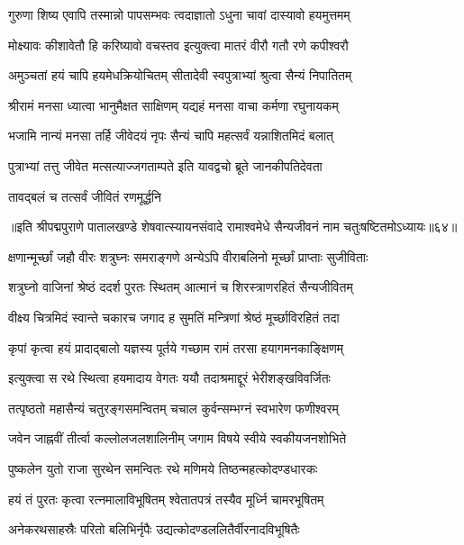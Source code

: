 \twolineshloka
{गुरुणा शिष्य एवापि तस्मान्नो पापसम्भवः}
{त्वदाज्ञातो ऽधुना चावां दास्यावो हयमुत्तमम्}%

\twolineshloka
{मोक्ष्यावः कीशावेतौ हि करिष्यावो वचस्तव}
{इत्युक्त्वा मातरं वीरौ गतौ रणे कपीश्वरौ}%

\twolineshloka
{अमुञ्चतां हयं चापि हयमेधक्रियोचितम्}
{सीतादेवी स्वपुत्राभ्यां श्रुत्वा सैन्यं निपातितम्}%

\twolineshloka
{श्रीरामं मनसा ध्यात्वा भानुमैक्षत साक्षिणम्}
{यद्यहं मनसा वाचा कर्मणा रघुनायकम्}%

\twolineshloka
{भजामि नान्यं मनसा तर्हि जीवेदयं नृपः}
{सैन्यं चापि महत्सर्वं यन्नाशितमिदं बलात्}%

\twolineshloka
{पुत्राभ्यां तत्तु जीवेत मत्सत्याज्जगताम्पते}
{इति यावद्वचो ब्रूते जानकीपतिदेवता}%

\onelineshloka
{तावद्बलं च तत्सर्वं जीवितं रणमूर्द्धनि}%

॥इति श्रीपद्मपुराणे पातालखण्डे शेषवात्स्यायनसंवादे रामाश्वमेधे सैन्यजीवनं नाम चतुःषष्टितमोऽध्यायः॥६४॥



\twolineshloka
{क्षणान्मूर्च्छां जहौ वीरः शत्रुघ्नः समराङ्गणे}
{अन्येऽपि वीराबलिनो मूर्च्छां प्राप्ताः सुजीविताः}%

\twolineshloka
{शत्रुघ्नो वाजिनां श्रेष्ठं ददर्श पुरतः स्थितम्}
{आत्मानं च शिरस्त्राणरहितं सैन्यजीवितम्}%

\twolineshloka
{वीक्ष्य चित्रमिदं स्वान्ते चकारच जगाद ह}
{सुमतिं मन्त्रिणां श्रेष्ठं मूर्च्छाविरहितं तदा}%

\twolineshloka
{कृपां कृत्वा हयं प्रादाद्बालो यज्ञस्य पूर्तये}
{गच्छाम रामं तरसा हयागमनकाङ्क्षिणम्}%

\twolineshloka
{इत्युक्त्वा स रथे स्थित्वा हयमादाय वेगतः}
{ययौ तदाश्रमाद्दूरं भेरीशङ्खविवर्जितः}%

\twolineshloka
{तत्पृष्ठतो महासैन्यं चतुरङ्गसमन्वितम्}
{चचाल कुर्वन्सम्भग्नं स्वभारेण फणीश्वरम्}%

\twolineshloka
{जवेन जाह्नवीं तीर्त्वा कल्लोलजलशालिनीम्}
{जगाम विषये स्वीये स्वकीयजनशोभिते}%

\twolineshloka
{पुष्कलेन युतो राजा सुरथेन समन्वितः}
{रथे मणिमये तिष्ठन्महत्कोदण्डधारकः}%

\twolineshloka
{हयं तं पुरतः कृत्वा रत्नमालाविभूषितम्}
{श्वेतातपत्रं तस्यैव मूर्ध्नि चामरभूषितम्}%

\twolineshloka
{अनेकरथसाहस्रैः परितो बलिभिर्नृपैः}
{उद्यत्कोदण्डललितैर्वीरनादविभूषितैः}%

